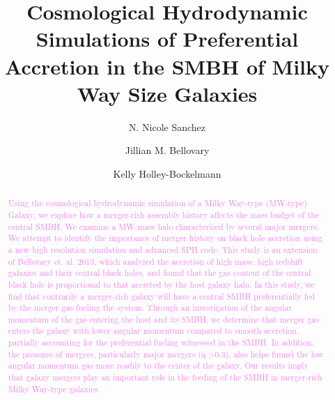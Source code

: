 \documentclass[manuscript]{aastex}
\begin{document}
 

\title{Cosmological Hydrodynamic Simulations of Preferential Accretion in the SMBH of Milky Way Size Galaxies}



\author{N. Nicole Sanchez }
\author{Jillian M. Bellovary}
\author{Kelly Holley-Bockelmann}



\begin{abstract}\label{abs:abstractlabel}
\textcolor{violet}{
Using the cosmological hydrodynamic simulation of a Milky Way-type (MW-type) Galaxy, we explore how a merger-rish assembly history affects the mass budget of the central SMBH. We examine a MW-mass halo characterized by several major mergers. We attempt to identify the importance of merger history on black hole accretion using a new high resolution simulation and advanced SPH code. This study is an extension of Bellovary et. al. 2013, which analyzed the accretion of high mass, high redshift galaxies and their central black holes, and found that the gas content of the central black hole is proportional to that accreted by the host galaxy halo. In this study, we find that contrarily a merger-rich galaxy will have a central SMBH preferentially fed by the merger gas fueling the system. Through an investigation of the angular momentum of the gas entering the host and its SMBH, we determine that merger gas enters the galaxy with lower angular momentum compared to smooth accretion, partially accounting for the preferential fueling witnessed in the SMBH. In addition, the presence of mergers, particularly major mergers (q \textgreater 0.3), also helps funnel the low angular momentum gas more readily to the center of the galaxy. Our results imply that galaxy mergers play an important role in the feeding of the SMBH in merger-rich Milky Way-type galaxies.
}
\end{abstract}
\end{document}
